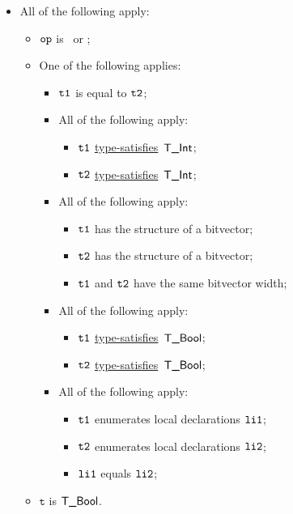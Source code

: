 \documentclass{book}
\newcommand\typesatisfies[0]{\hyperlink{def-typesatisfies}{type-satisfies}}
\newcommand\vt[0]{\texttt{t}}
\begin{document}
\begin{itemize}
  \item All of the following apply:
  \begin{itemize}
    \item $\texttt{op}$ is \EQOP\ or \NEQ;
    \item One of the following applies:
    \begin{itemize}
      \item $\texttt{t1}$ is equal to $\texttt{t2}$;
      \item All of the following apply:
      \begin{itemize}
        \item $\texttt{t1}$ \typesatisfies\  $\textsf{T\_Int}$;
        \item $\texttt{t2}$ \typesatisfies\  $\textsf{T\_Int}$;
      \end{itemize}
      \item All of the following apply:
      \begin{itemize}
        \item $\texttt{t1}$ has the structure of a bitvector;
        \item $\texttt{t2}$ has the structure of a bitvector;
        \item $\texttt{t1}$ and $\texttt{t2}$ have the same bitvector width;
      \end{itemize}
      \item All of the following apply:
      \begin{itemize}
        \item $\texttt{t1}$ \typesatisfies\  $\textsf{T\_Bool}$;
        \item $\texttt{t2}$ \typesatisfies\  $\textsf{T\_Bool}$;
      \end{itemize}
      \item All of the following apply:
      \begin{itemize}
        \item $\texttt{t1}$ enumerates local declarations $\texttt{li1}$;
        \item $\texttt{t2}$ enumerates local declarations $\texttt{li2}$;
        \item $\texttt{li1}$ equals $\texttt{li2}$;
      \end{itemize}
    \end{itemize}
    \item $\vt$ is $\textsf{T\_Bool}$.
  \end{itemize}


\end{itemize}
\end{document}
